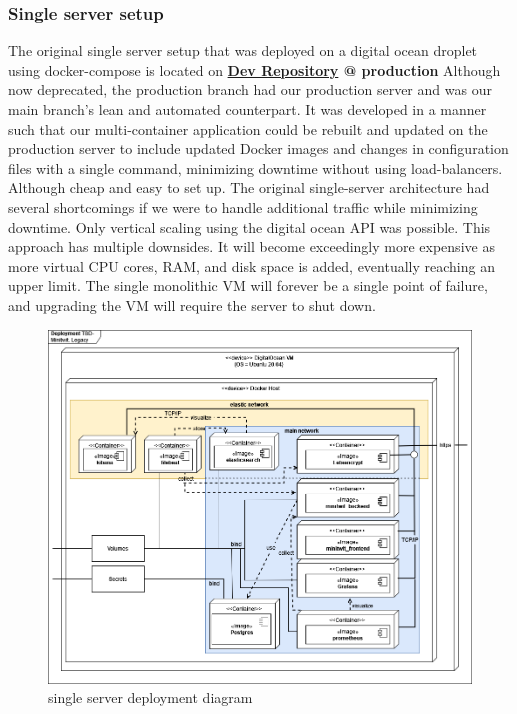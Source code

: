\subsubsection{Single server setup}
\label{subsubsec:scalingProd}
The original single server setup that was deployed on a digital ocean droplet using docker-compose is located on \textbf{\hyperref[app:devRepo]{Dev Repository} @ production}
Although now deprecated, the production branch had our production server and was our main branch's lean and automated counterpart. It was developed in a manner such that our multi-container application could be rebuilt and updated on the production server to include updated Docker images and changes in configuration files with a single command, minimizing downtime without using load-balancers.\\
Although cheap and easy to set up. The original single-server architecture had several shortcomings if we were to handle additional traffic while minimizing downtime.
Only vertical scaling using the digital ocean API was possible. This approach has multiple downsides. It will become exceedingly more expensive as more virtual CPU cores, RAM, and disk space is added, eventually reaching an upper limit. The single monolithic VM will forever be a single point of failure, and upgrading the VM will require the server to shut down.
\begin {figure}[H]
    \centering
    \includegraphics[scale=0.47]{images/deployment_diagrams/DevopsDiagrams-Legacy deploy mini.drawio.png}
    \caption{\mini single server deployment diagram}
    \label{fig:legacyDeploy}
\end{figure}

